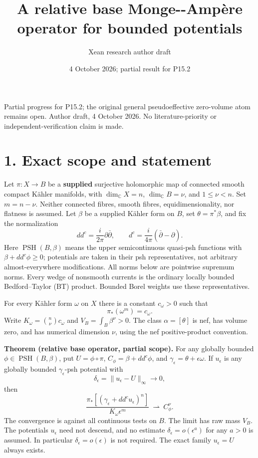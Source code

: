 \documentclass[
  11pt,
]{article}
\title{A relative base Monge-\/-Ampère operator for bounded potentials}
\author{Xean research author draft}
\date{4 October 2026; partial result for P15.2}
\begin{document}
\maketitle

Partial progress for P15.2; the original general pseudoeffective zero-volume atom remains open. Author draft, 4 October 2026. No literature-priority or independent-verification claim is made.

\section{1. Exact scope and statement}\label{exact-scope-and-statement}

Let \(\pi:X\to B\) be a \textbf{supplied} surjective holomorphic map of connected smooth compact Kähler manifolds, with \(\dim_{\mathbb C}X=n\), \(\dim_{\mathbb C}B=\nu\), and \(1\leq\nu<n\). Set \(m=n-\nu\). Neither connected fibres, smooth fibres, equidimensionality, nor flatness is assumed. Let \(\beta\) be a supplied Kähler form on \(B\), set \(\theta=\pi^*\beta\), and fix the normalization \[
dd^c=\frac{i}{2\pi}\partial\bar\partial,\qquad
d^c=\frac{i}{4\pi}(\bar\partial-\partial).
\] Here \(\operatorname{PSH}(B,\beta)\) means the upper semicontinuous quasi-psh functions with \(\beta+dd^c\phi\geq0\); potentials are taken in their psh representatives, not arbitrary almost-everywhere modifications. All norms below are pointwise supremum norms. Every wedge of nonsmooth currents is the ordinary locally bounded Bedford--Taylor (BT) product. Bounded Borel weights use these representatives.

For every Kähler form \(\omega\) on \(X\) there is a constant \(c_\omega>0\) such that \[
\pi_*(\omega^m)=c_\omega.
\] Write \(K_\omega=\binom n\nu c_\omega\) and \(V_B=\int_B\beta^\nu>0\). The class \(\alpha=[\theta]\) is nef, has volume zero, and has numerical dimension \(\nu\), using the nef positive-product convention.

\textbf{Theorem (relative base operator, partial scope).} For any globally bounded \(\phi\in\operatorname{PSH}(B,\beta)\), put \(U=\phi\circ\pi\), \(C_\phi=\beta+dd^c\phi\), and \(\gamma_\epsilon=\theta+\epsilon\omega\). If \(u_\epsilon\) is any globally bounded \(\gamma_\epsilon\)-psh potential with \[
\delta_\epsilon=\|u_\epsilon-U\|_\infty\longrightarrow0,
\] then \[
\frac{\pi_*[(\gamma_\epsilon+dd^c u_\epsilon)^n]}
 {K_\omega\epsilon^m}
\ \rightharpoonup\ C_\phi^\nu.                                      \tag{1}
\] The convergence is against all continuous tests on \(B\). The limit has raw mass \(V_B\). The potentials \(u_\epsilon\) need not descend, and no estimate \(\delta_\epsilon=o(\epsilon^a)\) for any \(a>0\) is assumed. In particular \(\delta_\epsilon=o(\epsilon)\) is not required. The exact family \(u_\epsilon=U\) always exists.
\end{document}
